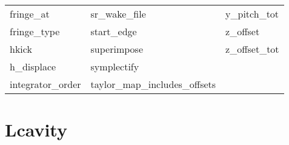 \begin{tabular}{lll}
fringe_at                   & sr_wake_file                & y_pitch_tot                 \\
fringe_type                 & start_edge                  & z_offset                    \\
hkick                       & superimpose                 & z_offset_tot                \\
h_displace                  & symplectify                 &                             \\
integrator_order            & taylor_map_includes_offsets &                             \\
 \bottomrule
 \end{tabular}
 \vfill
 
 \section{Lcavity}
 \label{s:list.lcavity}
 
